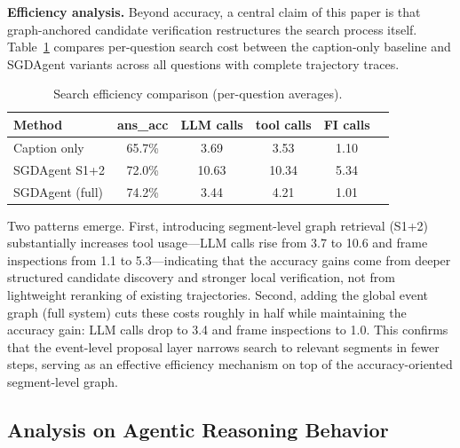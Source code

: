 \documentclass[sigconf, screen, review, anonymous]{acmart}
\begin{document}

\textbf{Efficiency analysis.}\quad
Beyond accuracy, a central claim of this paper is that graph-anchored
candidate verification restructures the search process itself.
Table~\ref{tab:behavior} compares per-question search cost between the
caption-only baseline and SGDAgent variants across all questions with
complete trajectory traces.

\begin{table}[t]
  \centering
  \caption{Search efficiency comparison (per-question averages).}
  \label{tab:behavior}
  \begin{tabular}{lccccc}
    \toprule
    Method & ans\_acc & LLM calls & tool calls & FI calls \\
    \midrule
    Caption only      & 65.7\% & 3.69 & 3.53 & 1.10 \\
    SGDAgent S1+2     & 72.0\% & 10.63 & 10.34 & 5.34 \\
    SGDAgent (full)   & 74.2\% & 3.44 & 4.21 & 1.01 \\
    \bottomrule
  \end{tabular}
\end{table}

Two patterns emerge.  First, introducing segment-level graph retrieval
(S1+2) substantially increases tool usage---LLM calls rise from 3.7 to
10.6 and frame inspections from 1.1 to 5.3---indicating that the
accuracy gains come from deeper structured candidate discovery and
stronger local verification, not from lightweight reranking of existing
trajectories.  Second, adding the global event graph (full system) cuts
these costs roughly in half while maintaining the accuracy gain: LLM
calls drop to 3.4 and frame inspections to 1.0.  This confirms that the
event-level proposal layer narrows search to relevant segments in fewer
steps, serving as an effective efficiency mechanism on top of the
accuracy-oriented segment-level graph.



\subsection{Analysis on Agentic Reasoning Behavior}
\label{sec:analysis}
\end{document}
